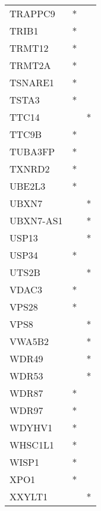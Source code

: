 \begin{longtable}{lcc}
TRAPPC9          &              * &            \\
TRIB1            &              * &            \\
TRMT12           &              * &            \\
TRMT2A           &              * &            \\
TSNARE1          &              * &            \\
TSTA3            &              * &            \\
TTC14            &                &          * \\
TTC9B            &              * &            \\
TUBA3FP          &              * &            \\
TXNRD2           &              * &            \\
UBE2L3           &              * &            \\
UBXN7            &                &          * \\
UBXN7-AS1        &                &          * \\
USP13            &                &          * \\
USP34            &              * &            \\
UTS2B            &                &          * \\
VDAC3            &              * &            \\
VPS28            &              * &            \\
VPS8             &                &          * \\
VWA5B2           &                &          * \\
WDR49            &                &          * \\
WDR53            &                &          * \\
WDR87            &              * &            \\
WDR97            &              * &            \\
WDYHV1           &              * &            \\
WHSC1L1          &              * &            \\
WISP1            &              * &            \\
XPO1             &              * &            \\
XXYLT1           &                &          * \\

\end{longtable}
